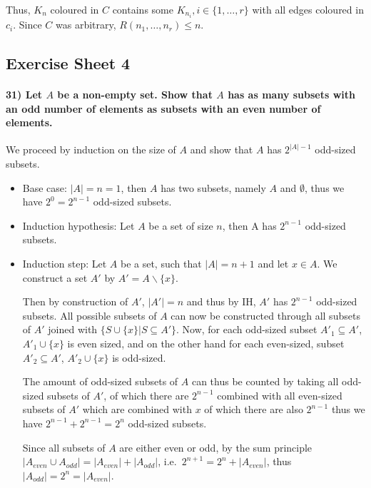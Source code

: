 \documentclass[
]{article}
\begin{document}
Thus, \(K_n\) coloured in \(C\) contains some
\(K_{n_i}, i \in \{1, \dots, r\}\) with all edges coloured in \(c_i\).
Since \(C\) was arbitrary, \(R(n_1, \dots, n_r) \leq n\).

\hypertarget{exercise-sheet-4}{%
\subsection{Exercise Sheet 4}\label{exercise-sheet-4}}

\hypertarget{let-a-be-a-non-empty-set.-show-that-a-has-as-many-subsets-with-an-odd-number-of-elements-as-subsets-with-an-even-number-of-elements.}{%
\paragraph{\texorpdfstring{31) Let \(A\) be a non-empty set. Show that
\(A\) has as many subsets with an odd number of elements as subsets with
an even number of
elements.}{31) Let A be a non-empty set. Show that A has as many subsets with an odd number of elements as subsets with an even number of elements.}}\label{let-a-be-a-non-empty-set.-show-that-a-has-as-many-subsets-with-an-odd-number-of-elements-as-subsets-with-an-even-number-of-elements.}}

We proceed by induction on the size of \(A\) and show that \(A\) has
\(2^{|A|-1}\) odd-sized subsets.

\begin{itemize}
\item
  Base case: \(|A| = n = 1\), then \(A\) has two subsets, namely \(A\)
  and \(\emptyset\), thus we have \(2^{0} = 2^{n-1}\) odd-sized subsets.
\item
  Induction hypothesis: Let \(A\) be a set of size \(n\), then A has
  \(2^{n-1}\) odd-sized subsets.
\item
  Induction step: Let \(A\) be a set, such that \(|A| = n+1\) and let
  \(x \in A\). We construct a set \(A'\) by
  \(A' = A \backslash \{ x \}\).

  Then by construction of \(A'\), \(|A'| = n\) and thus by IH, \(A'\)
  has \(2^{n-1}\) odd-sized subsets. All possible subsets of \(A\) can
  now be constructed through all subsets of \(A'\) joined with
  \(\{S \cup \{x\} | S \subseteq A'\}\). Now, for each odd-sized subset
  \(A'_{1} \subseteq A'\), \(A'_{1} \cup \{x\}\) is even sized, and on
  the other hand for each even-sized, subset \(A'_{2} \subseteq A'\),
  \(A'_{2} \cup \{x\}\) is odd-sized.

  The amount of odd-sized subsets of \(A\) can thus be counted by taking
  all odd-sized subsets of \(A'\), of which there are \(2^{n-1}\)
  combined with all even-sized subsets of \(A'\) which are combined with
  \(x\) of which there are also \(2^{n-1}\) thus we have
  \(2^{n-1} + 2^{n-1} = 2^n\) odd-sized subsets.

  Since all subsets of \(A\) are either even or odd, by the sum
  principle \(|A_{even} \cup A_{odd}| = |A_{even}| + |A_{odd}|\),
  i.e.~\(2^{n+1} = 2^n + |A_{even}|\), thus
  \(|A_{odd}| = 2^n = |A_{even}|\).
\end{itemize}
\end{document}
